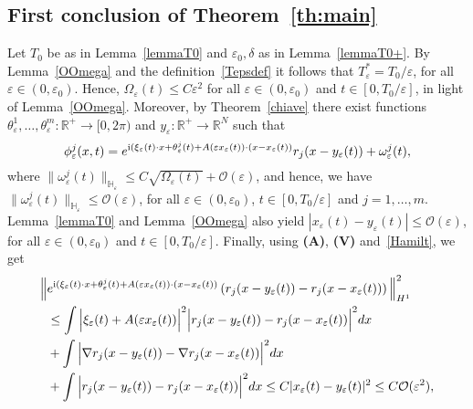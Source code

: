 \documentclass[11pt]{amsart}
\numberwithin{equation}{section}
\theoremstyle{definition}
\begin{document}
\subsection{First conclusion of Theorem~\ref{th:main}}
Let $T_0$ be as in Lemma~\ref{lemmaT0} and ${\varepsilon}_0,\delta$ as in Lemma~\ref{lemmaT0+}. By Lemma~\ref{OOmega} and
the definition~\eqref{Tepsdef} it follows that $T^*_{\varepsilon}=T_0/{\varepsilon}$, for all ${\varepsilon}\in
(0, {\varepsilon}_0)$. Hence, $\Omega_{\varepsilon}(t)\leq C{\varepsilon}^2$
for all ${\varepsilon}\in (0,{\varepsilon}_0)$ and $t\in [0,T_0/{\varepsilon}]$, in light of Lemma~\ref{OOmega}.
Moreover, by Theorem~\ref{chiave} there exist functions
$\theta^1_{\varepsilon}, \dots, \theta^m_{\varepsilon}:{{\mathbb R}}^+\to[0,2\pi)$ and $y_{\varepsilon}:{{\mathbb R}}^+\to{{\mathbb R}}^N$ such that
$$
\phi_{\varepsilon}^j(x,t)=e^{{{\rm i}} (\xi_{\varepsilon}(t)\cdot
x+\theta^j_{\varepsilon}(t)+A({\varepsilon} x_{\varepsilon}(t)) \cdot
(x-x_{\varepsilon}(t))}r_j(x-y_{\varepsilon}(t))+\omega^j_{\varepsilon}(t),
$$
where $\|\omega^j_{\varepsilon}(t)\|_{{{\mathbb H}}_{\varepsilon}}\leq C\sqrt{\Omega_{\varepsilon}(t)}+{\mathcal O}({\varepsilon})$,
and hence, we have
$\|\omega^j_{\varepsilon}(t)\|_{{{\mathbb H}}_{\varepsilon}}\leq {\mathcal O}({\varepsilon})$,
for all ${\varepsilon}\in(0,{\varepsilon}_{0})$, $t\in [0,T_0/{\varepsilon}]$ and $j=1, \dots, m$.
Lemma~\ref{lemmaT0} and Lemma~\ref{OOmega} also yield
$|x_{\varepsilon}(t)-y_{\varepsilon}(t)|\leq {\mathcal O}({\varepsilon})$,
for all ${\varepsilon}\in(0,{\varepsilon}_{0})$ and $t\in [0,T_0/{\varepsilon}]$.
Finally, using {\bf (A)}, {\bf (V)} and~\eqref{Hamilt}, we get
\begin{equation}\label{3}
\begin{aligned}
\Big\|& e^{{{\rm i}}(\xi_{\varepsilon}(t)\cdot x+\theta^j_{\varepsilon}(t)+A({\varepsilon} x_{\varepsilon}(t))
\cdot (x-x_{\varepsilon}(t))}\left(r_j(x-y_{\varepsilon}(t))-
r_j(x-x_{\varepsilon}(t))\right)\Big\|_{H^1}^2\\
& \leq \int\Big|\xi_{\varepsilon}(t)+A({\varepsilon} x_{\varepsilon} (t))\Big|^2\Big|r_j(x-y_{\varepsilon}(t))-
r_j(x-x_{\varepsilon}(t))\Big|^2dx\\
& +\int\Big|\nabla
r_j(x-y_{\varepsilon}(t))-
\nabla r_j(x-x_{\varepsilon}(t))\Big|^2 dx\\
& +\int\Big|r_j(x-y_{\varepsilon}(t))-
r_j(x-x_{\varepsilon}(t))\Big|^2dx
\leq C|x_{\varepsilon}(t)-y_{\varepsilon}(t)|^2\leq C{\mathcal O}({\varepsilon}^2),
\end{aligned}
\end{equation}
\end{document}
